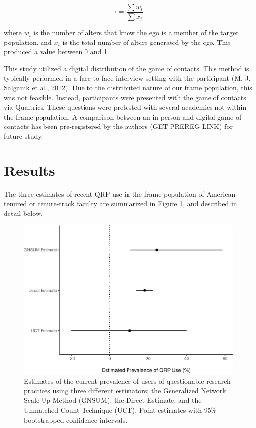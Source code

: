 \documentclass[man]{apa6}
\theoremstyle{definition}
\theoremstyle{definition}
\theoremstyle{definition}
\theoremstyle{remark}
\begin{document}
\begin{equation}
\tau = \frac{\sum{w_i}}{\sum{x_i}}
\end{equation}

where \(w_i\) is the number of alters that know the ego is a member of
the target population, and \(x_i\) is the total number of alters
generated by the ego. This produced a value between 0 and 1.

This study utilized a digital distribution of the game of contacts. This
method is typically performed in a face-to-face interview setting with
the participant (M. J. Salganik et al., 2012). Due to the distributed
nature of our frame population, this was not feasible. Instead,
participants were presented with the game of contacts via Qualtrics.
These questions were pretested with several academics not within the
frame population. A comparison between an in-person and digital game of
contacts has been pre-registered by the authors (GET PREREG LINK) for
future study.

\section{Results}\label{results}

The three estimates of recent QRP use in the frame population of
American tenured or tenure-track faculty are summarized in Figure
\ref{fig:fig1}, and described in detail below.

\begin{figure}
\centering
\includegraphics{papaja_test_files/figure-latex/fig1-1.pdf}
\caption{\label{fig:fig1}\label{fig:fig1}Estimates of the current prevalence
of users of questionable research practices using three different
estimators; the Generalized Network Scale-Up Method (GNSUM), the Direct
Estimate, and the Unmatched Count Technique (UCT). Point estimates with
95\% bootstrapped confidence intervals.}
\end{figure}
\end{document}
